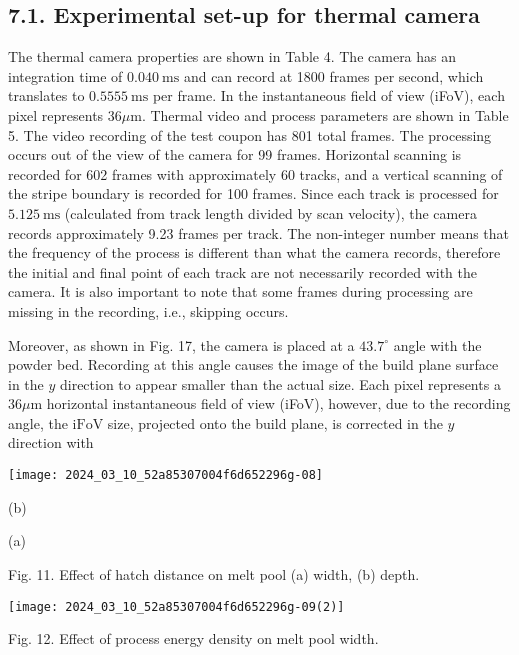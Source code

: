\documentclass[10pt]{article}
\begin{document}
\subsection*{7.1. Experimental set-up for thermal camera}
The thermal camera properties are shown in Table 4. The camera has an integration time of $0.040 \mathrm{~ms}$ and can record at 1800 frames per second, which translates to $0.5555 \mathrm{~ms}$ per frame. In the instantaneous field of view (iFoV), each pixel represents $36 \mu \mathrm{m}$. Thermal video and process parameters are shown in Table 5. The video recording of the test coupon has 801 total frames. The processing occurs out of the view of the camera for 99 frames. Horizontal scanning is recorded for 602 frames with approximately 60 tracks, and a vertical scanning of the stripe boundary is recorded for 100 frames. Since each track is processed for $5.125 \mathrm{~ms}$ (calculated from track length divided by scan velocity), the camera records approximately 9.23 frames per track. The non-integer number means that the frequency of the process is different than what the camera records, therefore the initial and final point of each track are not necessarily recorded with the camera. It is also important to note that some frames during processing are missing in the recording, i.e., skipping occurs.

Moreover, as shown in Fig. 17, the camera is placed at a $43.7^{\circ}$ angle with the powder bed. Recording at this angle causes the image of the build plane surface in the $y$ direction to appear smaller than the actual size. Each pixel represents a $36 \mu \mathrm{m}$ horizontal instantaneous field of view (iFoV), however, due to the recording angle, the $\mathrm{iFoV}$ size, projected onto the build plane, is corrected in the $y$ direction with

\begin{center}
\texttt{[image: 2024\_03\_10\_52a85307004f6d652296g-08]}
\end{center}

(b)

(a)

Fig. 11. Effect of hatch distance on melt pool (a) width, (b) depth.

\begin{center}
\texttt{[image: 2024\_03\_10\_52a85307004f6d652296g-09(2)]}
\end{center}

Fig. 12. Effect of process energy density on melt pool width.
\end{document}
